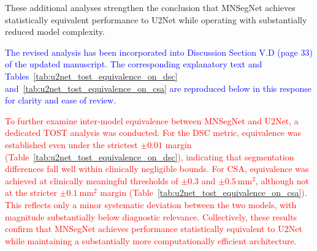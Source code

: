 \documentclass[12pt,letterpaper]{article}
\begin{document}
\begin{enumerate}
These additional analyses strengthen the conclusion that MNSegNet achieves statistically equivalent performance to U2Net while operating with substantially reduced model complexity.





\textcolor{blue}{The revised analysis has been incorporated into Discussion Section V.D (page 33) of the updated manuscript. The corresponding explanatory text and Tables~\ref{tab:u2net_tost_equivalence_on_dsc} and~\ref{tab:u2net_tost_equivalence_on_csa} are reproduced below in this response for clarity and ease of review.}


 \textcolor{red}{To further examine inter-model equivalence between MNSegNet and U2Net, a dedicated TOST analysis was conducted. For the DSC metric, equivalence was established even under the strictest $\pm 0.01$ margin (Table~\ref{tab:u2net_tost_equivalence_on_dsc}), indicating that segmentation differences fall well within clinically negligible bounds. For CSA, equivalence was achieved at clinically meaningful thresholds of $\pm 0.3$ and $\pm 0.5~\mathrm{mm}^2$, although not at the stricter $\pm 0.1~\mathrm{mm}^2$ margin (Table~\ref{tab:u2net_tost_equivalence_on_csa}). This reflects only a minor systematic deviation between the two models, with magnitude substantially below diagnostic relevance. Collectively, these results confirm that MNSegNet achieves performance statistically equivalent to U2Net while maintaining a substantially more computationally efficient architecture.}

\end{enumerate}







\end{document}
